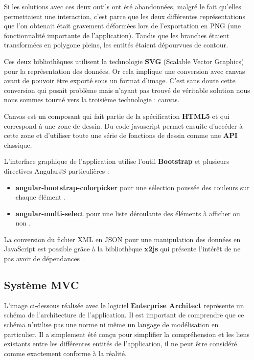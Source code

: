 \documentclass [a4paper,11pt]{article}
\begin{document}
Si les solutions avec ces deux outils ont été abandonnées, malgré le fait qu’elles permettaient une interaction, c’est parce que les deux différentes représentations que l’on obtenait était gravement déformées lors de l’exportation en PNG (une fonctionnalité importante de l’application). Tandis que les branches étaient transformées en polygone pleins, les entités étaient dépourvues de contour. 
\newline

Ces deux bibliothèques utilisent la technologie \textbf{SVG} (Scalable Vector Graphics) pour la représentation des données. Or cela implique une conversion avec canvas avant de pouvoir être exporté sous un format d’image. C’est sans doute cette conversion qui posait problème mais n’ayant pas trouvé de véritable solution nous nous sommes tourné vers la troisième technologie : canvas.
\newline

Canvas est un composant qui fait partie de la spécification \textbf{HTML5} et qui correspond à une zone de dessin. Du code javascript permet ensuite d’accéder à cette zone et d’utiliser toute une série de fonctions de dessin comme une \textbf{API} classique.
\newline

L’interface graphique de l’application utilise l’outil \textbf{Bootstrap} et plusieurs directives AngularJS particulières :
\newline

\begin{itemize}
 \item \textbf{angular-bootstrap-colorpicker} pour une sélection poussée des couleurs sur chaque élément \cite{colorpicker13}.
 \item \textbf{angular-multi-select} pour une liste déroulante des éléments à afficher ou non \cite{select14}.
 \newline
\end{itemize}

La conversion du fichier XML en JSON pour une manipulation des données en JavaScript est possible grâce à la bibliothèque \textbf{x2js} qui présente l’intérêt de ne pas avoir de dépendances \cite{x2js14}.
\newline

\subsection{Système MVC}
L’image ci-dessous réalisée avec le logiciel \textbf{Enterprise Architect} représente un schéma de l’architecture de l’application. Il est important de comprendre que ce schéma n’utilise pas une norme ni même un langage de modélisation en particulier. Il a simplement été conçu pour simplifier la compréhension et les liens existants entre les différentes entités de l’application, il ne peut être considéré comme exactement conforme à la réalité.
\newline
\end{document}
